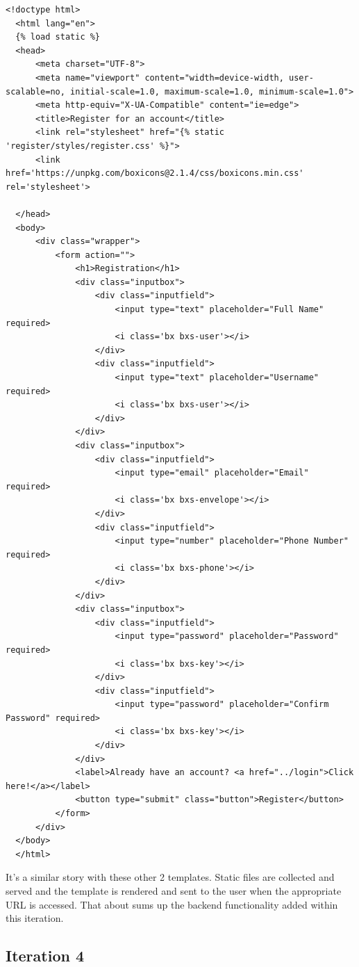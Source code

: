 \documentclass{article}
\begin{document}
\begin{lstlisting}[caption={templates/register.html}]
  <!doctype html>
  <html lang="en">
  {% load static %}
  <head>
      <meta charset="UTF-8">
      <meta name="viewport" content="width=device-width, user-scalable=no, initial-scale=1.0, maximum-scale=1.0, minimum-scale=1.0">
      <meta http-equiv="X-UA-Compatible" content="ie=edge">
      <title>Register for an account</title>
      <link rel="stylesheet" href="{% static 'register/styles/register.css' %}">
      <link href='https://unpkg.com/boxicons@2.1.4/css/boxicons.min.css' rel='stylesheet'>
  
  </head>
  <body>
      <div class="wrapper">
          <form action="">
              <h1>Registration</h1>
              <div class="inputbox">
                  <div class="inputfield">
                      <input type="text" placeholder="Full Name" required>
                      <i class='bx bxs-user'></i>
                  </div>
                  <div class="inputfield">
                      <input type="text" placeholder="Username" required>
                      <i class='bx bxs-user'></i>
                  </div>
              </div>
              <div class="inputbox">
                  <div class="inputfield">
                      <input type="email" placeholder="Email" required>
                      <i class='bx bxs-envelope'></i>
                  </div>
                  <div class="inputfield">
                      <input type="number" placeholder="Phone Number" required>
                      <i class='bx bxs-phone'></i>
                  </div>
              </div>
              <div class="inputbox">
                  <div class="inputfield">
                      <input type="password" placeholder="Password" required>
                      <i class='bx bxs-key'></i>
                  </div>
                  <div class="inputfield">
                      <input type="password" placeholder="Confirm Password" required>
                      <i class='bx bxs-key'></i>
                  </div>
              </div>
              <label>Already have an account? <a href="../login">Click here!</a></label>
              <button type="submit" class="button">Register</button>
          </form>
      </div>
  </body>
  </html>
\end{lstlisting}

It's a similar story with these other 2 templates. Static files are collected and served and the template is rendered and sent to the user when the appropriate URL is accessed. That about sums up the backend functionality added within this iteration. 

\subsection{Iteration 4}
\end{document}
